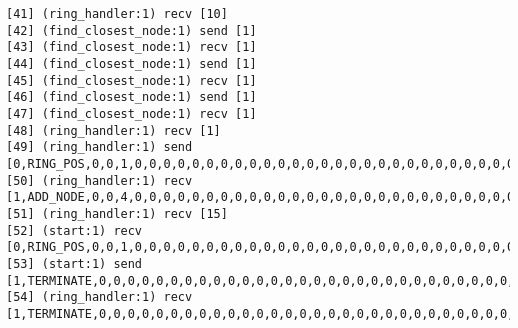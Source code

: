\begin{lstlisting}[xleftmargin=.01\linewidth, xrightmargin=0.01\linewidth, caption={Message passing caused by the proposer's protocol bug.}, label={lst:paxos_bug}]
[41] (ring_handler:1) recv [10]
[42] (find_closest_node:1) send [1]
[43] (find_closest_node:1) recv [1]
[44] (find_closest_node:1) send [1]
[45] (find_closest_node:1) recv [1]
[46] (find_closest_node:1) send [1]
[47] (find_closest_node:1) recv [1]
[48] (ring_handler:1) recv [1]
[49] (ring_handler:1) send [0,RING_POS,0,0,1,0,0,0,0,0,0,0,0,0,0,0,0,0,0,0,0,0,0,0,0,0,0,0,0,0,0,0,0,0,0,0,0,0]
[50] (ring_handler:1) recv [1,ADD_NODE,0,0,4,0,0,0,0,0,0,0,0,0,0,0,0,0,0,0,0,0,0,0,0,0,0,0,0,0,0,0,0,0,0,0,0,0]
[51] (ring_handler:1) recv [15]
[52] (start:1) recv [0,RING_POS,0,0,1,0,0,0,0,0,0,0,0,0,0,0,0,0,0,0,0,0,0,0,0,0,0,0,0,0,0,0,0,0,0,0,0,0]
[53] (start:1) send [1,TERMINATE,0,0,0,0,0,0,0,0,0,0,0,0,0,0,0,0,0,0,0,0,0,0,0,0,0,0,0,0,0,0,0,0,0,0,0,0]
[54] (ring_handler:1) recv [1,TERMINATE,0,0,0,0,0,0,0,0,0,0,0,0,0,0,0,0,0,0,0,0,0,0,0,0,0,0,0,0,0,0,0,0,0,0,0,0]
\end{lstlisting}

